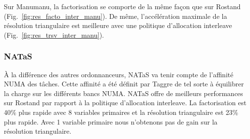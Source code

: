Sur Manumanu, la factorisation se comporte de la même façon que sur Rostand (Fig.~\ref{fig:res_facto_inter_manu}).
%
De même, l'accélération maximale de la résolution triangulaire est meilleure avec une politique d'allocation interleave (Fig.~\ref{fig:res_trsv_inter_manu}).




\subsubsection{NATaS}
\`A la différence des autres ordonnanceurs, NATaS va tenir compte de l'affinité NUMA des tâches.
%
Cette affinité a été définit par Taggre de tel sorte à équilibrer la charge sur les différents bancs NUMA.
%
NATaS offre de meilleurs performances sur Rostand par rapport à la politique d'allocation interleave.
%
La factorisation est 40\% plus rapide avec 8 variables primaires et la résolution triangulaire est 23\% plus rapide.
%
Avec 1 variable primaire nous n'obtenons pas de gain sur la résolution triangulaire.
